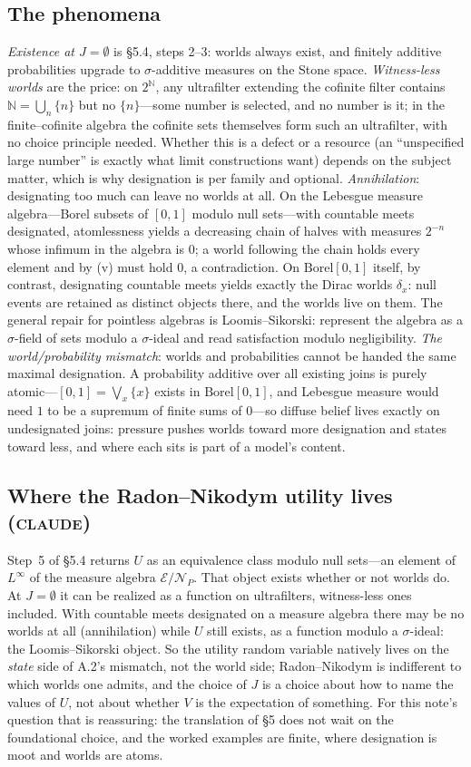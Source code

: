 \documentclass[11pt,a4paper]{article}
\newcommand{\N}{\mathbb{N}}
\newcommand{\cE}{\mathcal{E}}
\newcommand{\Borel}{\mathrm{Borel}}
\newcommand{\CLAUDE}{\textnormal{\scshape claude}}
\begin{document}
\subsection{The phenomena}
\emph{Existence at $J = \emptyset$} is \S5.4, steps 2--3: worlds always exist, and finitely additive probabilities upgrade to $\sigma$-additive measures on the Stone space. \emph{Witness-less worlds} are the price: on $2^{\N}$, any ultrafilter extending the cofinite filter contains $\N = \bigcup_n \{n\}$ but no $\{n\}$---some number is selected, and no number is it; in the finite--cofinite algebra the cofinite sets themselves form such an ultrafilter, with no choice principle needed. Whether this is a defect or a resource (an ``unspecified large number'' is exactly what limit constructions want) depends on the subject matter, which is why designation is per family and optional. \emph{Annihilation}: designating too much can leave no worlds at all. On the Lebesgue measure algebra---Borel subsets of $[0,1]$ modulo null sets---with countable meets designated, atomlessness yields a decreasing chain of halves with measures $2^{-n}$ whose infimum in the algebra is $0$; a world following the chain holds every element and by (v) must hold $0$, a contradiction. On $\Borel[0,1]$ itself, by contrast, designating countable meets yields exactly the Dirac worlds $\delta_x$: null events are retained as distinct objects there, and the worlds live on them. The general repair for pointless algebras is Loomis--Sikorski: represent the algebra as a $\sigma$-field of sets modulo a $\sigma$-ideal and read satisfaction modulo negligibility. \emph{The world/probability mismatch}: worlds and probabilities cannot be handed the same maximal designation. A probability additive over all existing joins is purely atomic---$[0,1] = \bigvee_x \{x\}$ exists in $\Borel[0,1]$, and Lebesgue measure would need $1$ to be a supremum of finite sums of $0$---so diffuse belief lives exactly on undesignated joins: pressure pushes worlds toward more designation and states toward less, and where each sits is part of a model's content.

\subsection{Where the Radon--Nikodym utility lives (\CLAUDE)}
Step~5 of \S5.4 returns $U$ as an equivalence class modulo null sets---an element of $L^\infty$ of the measure algebra $\cE / \mathcal N_P$. That object exists whether or not worlds do. At $J = \emptyset$ it can be realized as a function on ultrafilters, witness-less ones included. With countable meets designated on a measure algebra there may be no worlds at all (annihilation) while $U$ still exists, as a function modulo a $\sigma$-ideal: the Loomis--Sikorski object. So the utility random variable natively lives on the \emph{state} side of A.2's mismatch, not the world side; Radon--Nikodym is indifferent to which worlds one admits, and the choice of $J$ is a choice about how to name the values of $U$, not about whether $V$ is the expectation of something. For this note's question that is reassuring: the translation of \S5 does not wait on the foundational choice, and the worked examples are finite, where designation is moot and worlds are atoms.
\end{document}
